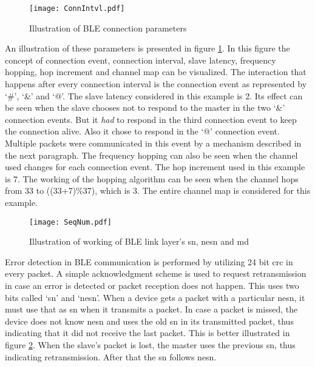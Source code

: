 \begin{figure}[h]
\centering
\texttt{[image: ConnIntvl.pdf]}
\caption{Illustration of BLE connection parameters}
\label{fig:ConnIntvl}
\end{figure}

An illustration of these parameters is presented in figure \ref{fig:ConnIntvl}. In this figure the concept of connection event, connection interval, slave latency, frequency hopping, hop increment and channel map can be visualized. The interaction that happens after every connection interval is the connection event as represented by `\#', `\&' and `@'. The slave latency considered in this example is 2. Its effect can be seen when the slave chooses not to respond to the master in the two `\&' connection events. But it \emph{had} to respond in the third connection event to keep the connection alive. Also it chose to respond in the `@' connection event. Multiple packets were communicated in this event by a mechanism described in the next paragraph. The frequency hopping can also be seen when the channel used changes for each connection event. The hop increment used in this example is 7. The working of the hopping algorithm can be seen when the channel hops from 33 to ((33+7)\%37), which is 3. The entire channel map is considered for this example. 


\begin{figure}[h]
\centering
\texttt{[image: SeqNum.pdf]}
\caption{Illustration of working of BLE link layer's \gls{sn}, \gls{nesn} and \acrshort{md} \cite{Heydon2012}}
\label{fig:SeqNum}
\end{figure}

Error detection in BLE communication is performed by utilizing 24 bit \gls{crc} in every packet. A simple acknowledgment scheme is used to request retransmission in case an error is detected or packet reception does not happen. This uses two bits called `\gls{sn}' and `\gls{nesn}'. When a device gets a packet with a particular \gls{nesn},  it must use that as \gls{sn} when it transmits a packet. In case a packet is missed, the device does not know \gls{nesn} and uses the old \gls{sn} in its transmitted packet, thus indicating that it did not receive the last packet. This is better illustrated in figure \ref{fig:SeqNum}. When the slave's packet is lost, the master uses the previous \gls{sn}, thus indicating retransmission. After that the \gls{sn} follows \gls{nesn}.

